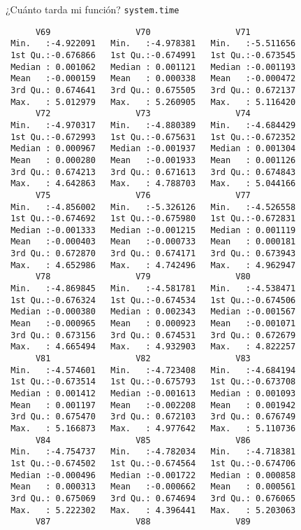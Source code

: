 \documentclass[xcolor={usenames,svgnames,dvipsnames}]{beamer}
\begin{document}
\begin{frame}[label={sec:orga833b1a},fragile]{¿Cuánto tarda mi función? \texttt{system.time}}
\begin{verbatim}
      V69                 V70                 V71           
 Min.   :-4.922091   Min.   :-4.978381   Min.   :-5.511656  
 1st Qu.:-0.676866   1st Qu.:-0.674991   1st Qu.:-0.673545  
 Median : 0.001062   Median : 0.001121   Median :-0.001193  
 Mean   :-0.000159   Mean   : 0.000338   Mean   :-0.000472  
 3rd Qu.: 0.674641   3rd Qu.: 0.675505   3rd Qu.: 0.672137  
 Max.   : 5.012979   Max.   : 5.260905   Max.   : 5.116420  
      V72                 V73                 V74           
 Min.   :-4.970317   Min.   :-4.880389   Min.   :-4.684429  
 1st Qu.:-0.672993   1st Qu.:-0.675631   1st Qu.:-0.672352  
 Median : 0.000967   Median :-0.001937   Median : 0.001304  
 Mean   : 0.000280   Mean   :-0.001933   Mean   : 0.001126  
 3rd Qu.: 0.674213   3rd Qu.: 0.671613   3rd Qu.: 0.674843  
 Max.   : 4.642863   Max.   : 4.788703   Max.   : 5.044166  
      V75                 V76                 V77           
 Min.   :-4.856002   Min.   :-5.326126   Min.   :-4.526558  
 1st Qu.:-0.674692   1st Qu.:-0.675980   1st Qu.:-0.672831  
 Median :-0.001333   Median :-0.001215   Median : 0.001119  
 Mean   :-0.000403   Mean   :-0.000733   Mean   : 0.000181  
 3rd Qu.: 0.672870   3rd Qu.: 0.674171   3rd Qu.: 0.673943  
 Max.   : 4.652986   Max.   : 4.742496   Max.   : 4.962947  
      V78                 V79                 V80           
 Min.   :-4.869845   Min.   :-4.581781   Min.   :-4.538471  
 1st Qu.:-0.676324   1st Qu.:-0.674534   1st Qu.:-0.674506  
 Median :-0.000380   Median : 0.002343   Median :-0.001567  
 Mean   :-0.000965   Mean   : 0.000923   Mean   :-0.001071  
 3rd Qu.: 0.673156   3rd Qu.: 0.674531   3rd Qu.: 0.672679  
 Max.   : 4.665494   Max.   : 4.932903   Max.   : 4.822257  
      V81                 V82                 V83           
 Min.   :-4.574601   Min.   :-4.723408   Min.   :-4.684194  
 1st Qu.:-0.673514   1st Qu.:-0.675793   1st Qu.:-0.673708  
 Median : 0.001412   Median :-0.001613   Median : 0.001093  
 Mean   : 0.001197   Mean   :-0.002208   Mean   : 0.001942  
 3rd Qu.: 0.675470   3rd Qu.: 0.672103   3rd Qu.: 0.676749  
 Max.   : 5.166873   Max.   : 4.977642   Max.   : 5.110736  
      V84                 V85                 V86           
 Min.   :-4.754737   Min.   :-4.782034   Min.   :-4.718381  
 1st Qu.:-0.674502   1st Qu.:-0.674564   1st Qu.:-0.674706  
 Median :-0.000496   Median :-0.001722   Median : 0.000858  
 Mean   : 0.000313   Mean   :-0.000662   Mean   : 0.000561  
 3rd Qu.: 0.675069   3rd Qu.: 0.674694   3rd Qu.: 0.676065  
 Max.   : 5.222302   Max.   : 4.396441   Max.   : 5.203063  
      V87                 V88                 V89           

\end{verbatim}
\end{frame}
\end{document}

